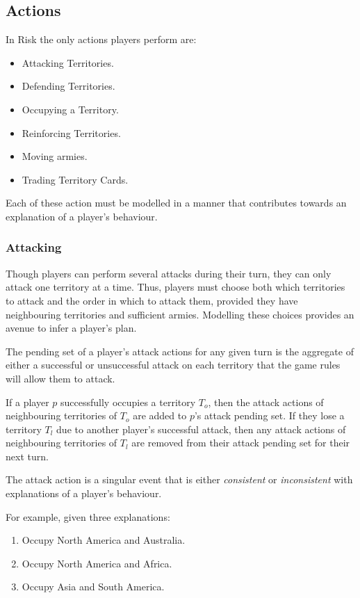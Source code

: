 \documentclass[parskip]{cs4rep}
\begin{document}
\subsection{Actions}

In Risk the only actions players perform are:

\begin{itemize}
\item
Attacking Territories.
\item
Defending Territories.
\item
Occupying a Territory.
\item
Reinforcing Territories.
\item
Moving armies.
\item
Trading Territory Cards.
\end{itemize}

Each of these action must be modelled in a manner that contributes towards an explanation of a player's behaviour.

\subsubsection{Attacking}

Though players can perform several attacks during their turn, they can only attack one territory at a time. Thus, players must choose both which territories to attack and the order in which to attack them, provided they have neighbouring territories and sufficient armies. Modelling these choices provides an avenue to infer a player’s plan.

The pending set of a player's attack actions for any given turn is the aggregate of either a successful or unsuccessful attack on each territory that the game rules will allow them to attack. 

If a player $p$ successfully occupies a territory $T_{o}$, then the attack actions of neighbouring territories of $T_{o}$ are added to $p$'s attack pending set. If they lose a territory $T_{l}$ due to another player's successful attack, then any attack actions of neighbouring territories of $T_{l}$ are removed from their attack pending set for their next turn. 

The attack action is a singular event that is either \textit{consistent} or \textit{inconsistent} with explanations of a player’s behaviour. 

For example, given three explanations:

\begin{enumerate}
\item
Occupy North America and Australia.
\item
Occupy North America and Africa.
\item
Occupy Asia and South America.
\end{enumerate}
\end{document}
